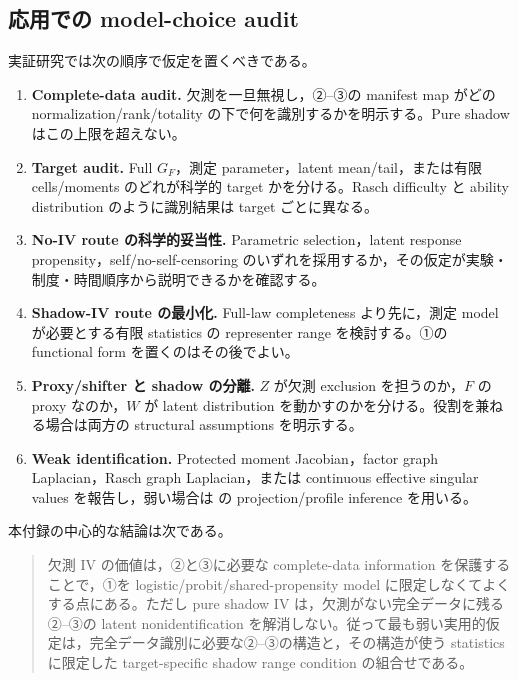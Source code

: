 \documentclass[11pt,a4paper]{ltjsarticle}
\theoremstyle{remark}
\begin{document}
\subsection{応用での model-choice audit}

実証研究では次の順序で仮定を置くべきである。
\begin{enumerate}[label=\textbf{Step \arabic*.},leftmargin=25mm]
\item \textbf{Complete-data audit.} 欠測を一旦無視し，②--③の manifest map がどの normalization/rank/totality の下で何を識別するかを明示する。Pure shadow はこの上限を超えない。
\item \textbf{Target audit.} Full $G_F$，測定 parameter，latent mean/tail，または有限 cells/moments のどれが科学的 target かを分ける。Rasch difficulty と ability distribution のように識別結果は target ごとに異なる。
\item \textbf{No-IV route の科学的妥当性.} Parametric selection，latent response propensity，self/no-self-censoring のいずれを採用するか，その仮定が実験・制度・時間順序から説明できるかを確認する。
\item \textbf{Shadow-IV route の最小化.} Full-law completeness より先に，測定 model が必要とする有限 statistics の representer range を検討する。①の functional form を置くのはその後でよい。
\item \textbf{Proxy/shifter と shadow の分離.} $Z$ が欠測 exclusion を担うのか，$F$ の proxy なのか，$W$ が latent distribution を動かすのかを分ける。役割を兼ねる場合は両方の structural assumptions を明示する。
\item \textbf{Weak identification.} Protected moment Jacobian，factor graph Laplacian，Rasch graph Laplacian，または continuous effective singular values を報告し，弱い場合は  の projection/profile inference を用いる。
\end{enumerate}

本付録の中心的な結論は次である。
\begin{quote}
欠測 IV の価値は，②と③に必要な complete-data information を保護することで，①を logistic/probit/shared-propensity model に限定しなくてよくする点にある。ただし pure shadow IV は，欠測がない完全データに残る②--③の latent nonidentification を解消しない。従って最も弱い実用的仮定は，完全データ識別に必要な②--③の構造と，その構造が使う statistics に限定した target-specific shadow range condition の組合せである。
\end{quote}
\end{document}
